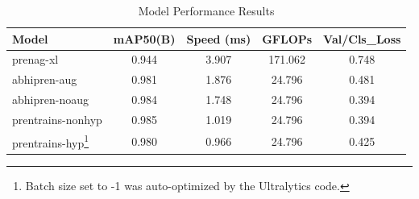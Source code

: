 \documentclass[11pt]{IEEEtran}
\begin{document}
\begin{table}[t]
    \centering
    \caption{Comprehensive Results: Epochs, Loss, Model Parameters, Speed,
        GFLOPs, and mAP Across All Models}
    \label{table:comprehensive_results}
\end{table}

\begin{table}[h!]
    \centering
    \caption{Model Performance Results}
    \label{table:performance_results}
    \begin{tabular}{lcccc}
        \toprule
        Model              & mAP50(B) & Speed (ms) & GFLOPs  & Val/Cls\_Loss \\
        \midrule
        prenag-xl          & 0.944    & 3.907      & 171.062 & 0.748         \\
        abhipren-aug       & 0.981    & 1.876      & 24.796  & 0.481         \\
        abhipren-noaug     & 0.984    & 1.748      & 24.796  & 0.394         \\
        prentrains-nonhyp  & 0.985    & 1.019      & 24.796  & 0.394         \\
        prentrains-hyp\footnote{Batch size set to -1 was auto-optimized by the
        Ultralytics code.} & 0.980    & 0.966      & 24.796  & 0.425         \\
        \bottomrule
    \end{tabular}
\end{table}
\end{document}
